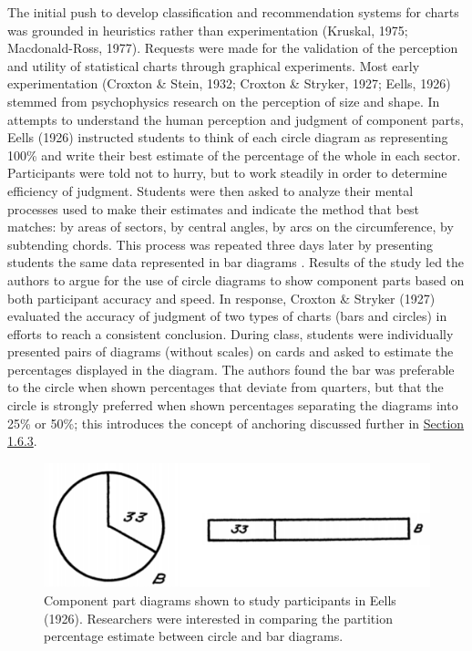 \documentclass[print]{nuthesis}
\begin{document}
The initial push to develop classification and recommendation systems for charts was grounded in heuristics rather than experimentation (Kruskal, 1975; Macdonald-Ross, 1977).
Requests were made for the validation of the perception and utility of statistical charts through graphical experiments.
Most early experimentation (Croxton \& Stein, 1932; Croxton \& Stryker, 1927; Eells, 1926) stemmed from psychophysics research on the perception of size and shape.
In attempts to understand the human perception and judgment of component parts, Eells (1926) instructed students to think of each circle diagram  as representing 100\% and write their best estimate of the percentage of the whole in each sector.
Participants were told not to hurry, but to work steadily in order to determine efficiency of judgment.
Students were then asked to analyze their mental processes used to make their estimates and indicate the method that best matches: by areas of sectors, by central angles, by arcs on the circumference, by subtending chords.
This process was repeated three days later by presenting students the same data represented in bar diagrams .
Results of the study led the authors to argue for the use of circle diagrams to show component parts based on both participant accuracy and speed.
In response, Croxton \& Stryker (1927) evaluated the accuracy of judgment of two types of charts (bars and circles) in efforts to reach a consistent conclusion.
During class, students were individually presented pairs of diagrams (without scales) on cards and asked to estimate the percentages displayed in the diagram.
The authors found the bar was preferable to the circle when shown percentages that deviate from quarters, but that the circle is strongly preferred when shown percentages separating the diagrams into 25\% or 50\%; this introduces the concept of anchoring discussed further in \protect\hyperlink{estimation-biases}{Section 1.6.3}.

\begin{figure}[tbp]

{\centering \includegraphics[width=0.75\linewidth,]{images/eells-component-parts} 

}

\caption[Eells (1926) component parts diagrams]{Component part diagrams shown to study participants in Eells (1926). Researchers were interested in comparing the partition percentage estimate between circle and bar diagrams.}\label{fig:eells-compoment-parts}
\end{figure}
\end{document}
